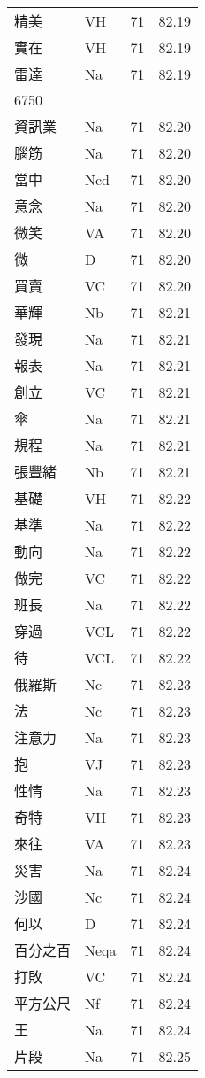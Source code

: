 \documentclass[twocolumn]{book}
\begin{document}
\begin{supertabular}{llrr}
精美 & VH & 71 &  82.19\\
實在 & VH & 71 &  82.19\\
雷達 & Na & 71 &  82.19\\
6750\\
資訊業 & Na & 71 &  82.20\\
腦筋 & Na & 71 &  82.20\\
當中 & Ncd & 71 &  82.20\\
意念 & Na & 71 &  82.20\\
微笑 & VA & 71 &  82.20\\
微 & D & 71 &  82.20\\
買賣 & VC & 71 &  82.20\\
華輝 & Nb & 71 &  82.21\\
發現 & Na & 71 &  82.21\\
報表 & Na & 71 &  82.21\\
創立 & VC & 71 &  82.21\\
傘 & Na & 71 &  82.21\\
規程 & Na & 71 &  82.21\\
張豐緒 & Nb & 71 &  82.21\\
基礎 & VH & 71 &  82.22\\
基準 & Na & 71 &  82.22\\
動向 & Na & 71 &  82.22\\
做完 & VC & 71 &  82.22\\
班長 & Na & 71 &  82.22\\
穿過 & VCL & 71 &  82.22\\
待 & VCL & 71 &  82.22\\
俄羅斯 & Nc & 71 &  82.23\\
法 & Nc & 71 &  82.23\\
注意力 & Na & 71 &  82.23\\
抱 & VJ & 71 &  82.23\\
性情 & Na & 71 &  82.23\\
奇特 & VH & 71 &  82.23\\
來往 & VA & 71 &  82.23\\
災害 & Na & 71 &  82.24\\
沙國 & Nc & 71 &  82.24\\
何以 & D & 71 &  82.24\\
百分之百 & Neqa & 71 &  82.24\\
打敗 & VC & 71 &  82.24\\
平方公尺 & Nf & 71 &  82.24\\
王 & Na & 71 &  82.24\\
片段 & Na & 71 &  82.25\\

\end{supertabular}
\end{document}
